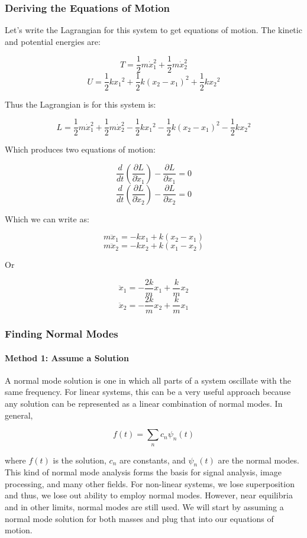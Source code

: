\subsubsection{Deriving the Equations of
Motion}\label{deriving-the-equations-of-motion}

Let's write the Lagrangian for this system to get equations of motion.
The kinetic and potential energies are:

\[T=\frac{1}{2}m\dot{x}_1^2+\frac{1}{2}m\dot{x}_2^2\]
\[U=\frac{1}{2}k{x_1}^2+\frac{1}{2}k(x_2-x_1)^2 + \frac{1}{2}k{x_2}^2\]

Thus the Lagrangian is for this system is:

\[L = \frac{1}{2}m\dot{x}_1^2+\frac{1}{2}m\dot{x}_2^2 - \frac{1}{2}k{x_1}^2-\frac{1}{2}k(x_2-x_1)^2 - \frac{1}{2}k{x_2}^2\]

Which produces two equations of motion:

\[\frac{d}{dt}\left(\frac{\partial L}{\partial \dot{x}_1}\right) - \frac{\partial L}{\partial x_1} = 0\]
\[\frac{d}{dt}\left(\frac{\partial L}{\partial \dot{x}_2}\right) - \frac{\partial L}{\partial x_2} = 0\]

Which we can write as:

\[m\ddot{x}_1 = -kx_1 + k(x_2-x_1)\]
\[m\ddot{x}_2 = -kx_2 + k(x_1-x_2)\]

Or

\[\ddot{x}_1 = -\frac{2k}{m}x_1 + \frac{k}{m}x_2\]
\[\ddot{x}_2 = -\frac{2k}{m}x_2 + \frac{k}{m}x_1\]

\subsubsection{Finding Normal Modes}\label{finding-normal-modes}

\paragraph{Method 1: Assume a
Solution}\label{method-1-assume-a-solution}

A normal mode solution is one in which all parts of a system oscillate
with the same frequency. For linear systems, this can be a very useful
approach because any solution can be represented as a linear combination
of normal modes. In general,

\[f(t) = \sum_n c_n \psi_n(t)\]

where \(f(t)\) is the solution, \(c_n\) are constants, and \(\psi_n(t)\)
are the normal modes. This kind of normal mode analysis forms the basis
for signal analysis, image processing, and many other fields. For
non-linear systems, we lose superposition and thus, we lose out ability
to employ normal modes. However, near equilibria and in other limits,
normal modes are still used. We will start by assuming a normal mode
solution for both masses and plug that into our equations of motion.

